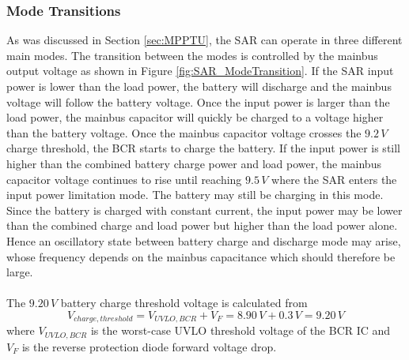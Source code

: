 \subsubsection{Mode Transitions}
%
As was discussed in Section \ref{sec:MPPTU}, the \ac{SAR} can operate in three different main modes. The transition between the modes is controlled by the mainbus output voltage as shown in Figure \ref{fig:SAR_ModeTransition}. If the \ac{SAR} input power is lower than the load power, the battery will discharge and the mainbus voltage will follow the battery voltage. Once the input power is larger than the load power, the mainbus capacitor will quickly be charged to a voltage higher than the battery voltage. Once the mainbus capacitor voltage crosses the $9.2\,V$ charge threshold, the \ac{BCR} starts to charge the battery. If the input power is still higher than the combined battery charge power and load power, the mainbus capacitor voltage continues to rise until reaching $9.5\,V$ where the \ac{SAR} enters the input power limitation mode. The battery may still be charging in this mode. Since the battery is charged with constant current, the input power may be lower than the combined charge and load power but higher than the load power alone. Hence an oscillatory state between battery charge and discharge mode may arise, whose frequency depends on the mainbus capacitance which should therefore be large. 
\\
\\
The $9.20\,V$ battery charge threshold voltage is calculated from
%
\begin{equation}
V_{charge,threshold}=V_{UVLO,BCR}+V_F=8.90\,V+0.3\,V= 9.20\,V
\end{equation}
%
where $V_{UVLO,BCR}$ is the worst-case \ac{UVLO} threshold voltage of the \ac{BCR} \ac{IC} and $V_F$ is the reverse protection diode forward voltage drop.
%
%
